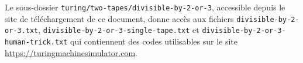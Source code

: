 Le sous-dossier
\verb+turing/two-tapes/divisible-by-2-or-3+,
accessible depuis le site de téléchargement de ce document,
donne accès aux fichiers 
\verb+divisible-by-2-or-3.txt+,
\verb+divisible-by-2-or-3-single-tape.txt+
et
\verb+divisible-by-2-or-3-human-trick.txt+
qui contiennent des codes utilisables sur le site \url{https://turingmachinesimulator.com}.